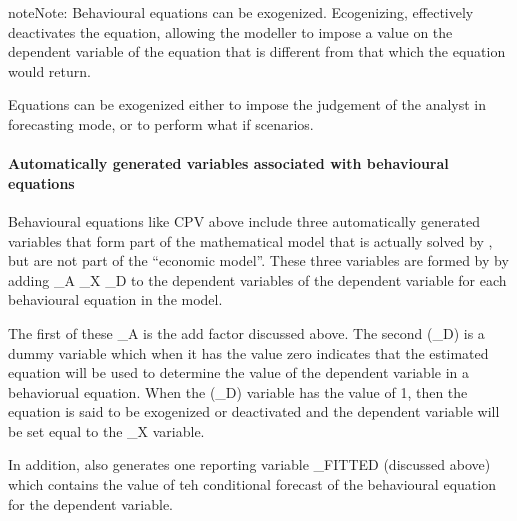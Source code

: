 \documentclass[letterpaper,10pt,english]{jupyterBook}
\begin{document}
\begin{sphinxadmonition}{note}{Note:}
\sphinxAtStartPar
Behavioural equations can be exogenized. Ecogenizing, effectively de\sphinxhyphen{}activates the equation, allowing the modeller to impose a value on the dependent variable of the equation that is different from that which the equation would return.

\sphinxAtStartPar
Equations can be exogenized either to impose the judgement of the analyst in forecasting mode, or to perform what if scenarios.
\end{sphinxadmonition}


\paragraph{Automatically generated variables associated with behavioural equations}
\label{\detokenize{content/05_SimpleModel/SimpleModel:automatically-generated-variables-associated-with-behavioural-equations}}
\sphinxAtStartPar
Behavioural equations like CPV above include three automatically generated variables that form part of the mathematical model that is actually solved by , but are not part of the “economic model”. These three variables are formed by by adding \_A \_X \_D to the dependent variables of the dependent variable for each behavioural equation in the model.

\sphinxAtStartPar
The first of these \_A is the add factor discussed above.  The second (\_D) is a dummy variable which when it has the value zero indicates that the estimated equation will be used to determine the value of the dependent variable in a behaviorual equation. When the (\_D) variable has the value of 1, then the equation is said to be exogenized or de\sphinxhyphen{}activated and the dependent variable will be set equal to the \_X variable.

\sphinxAtStartPar
In addition,  also generates one reporting variable \_FITTED (discussed above) which contains the value of teh conditional forecast of the behavioural equation for the dependent variable.
\end{document}
